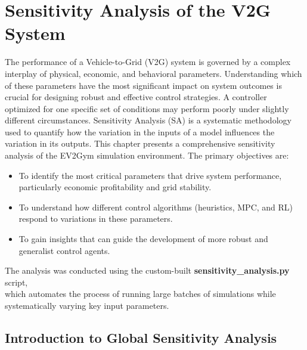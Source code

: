 \chapter{Sensitivity Analysis of the V2G System}
\label{chap:sensitivity_analysis}


The performance of a Vehicle-to-Grid (V2G) system is governed by a complex interplay of physical, economic, and behavioral parameters. Understanding which of these parameters have the most significant impact on system outcomes is crucial for designing robust and effective control strategies. A controller optimized for one specific set of conditions may perform poorly under slightly different circumstances. Sensitivity Analysis (SA) is a systematic methodology used to quantify how the variation in the inputs of a model influences the variation in its outputs.
\noindent
This chapter presents a comprehensive sensitivity analysis of the EV2Gym simulation environment. The primary objectives are:
\begin{itemize}
    \item To identify the most critical parameters that drive system performance, particularly economic profitability and grid stability.
    \item To understand how different control algorithms (heuristics, MPC, and RL) respond to variations in these parameters.
    \item To gain insights that can guide the development of more robust and generalist control agents.
\end{itemize}
\noindent
The analysis was conducted using the custom-built \textbf{sensitivity\_analysis.py} script,
\\
\noindent which automates the process of running large batches of simulations while systematically varying key input parameters.


\section{Introduction to Global Sensitivity Analysis}

